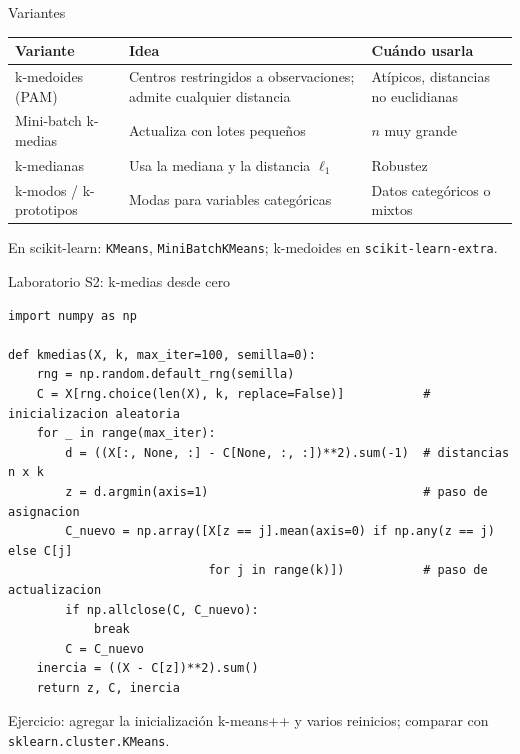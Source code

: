 \documentclass[aspectratio=169,11pt]{beamer}
\begin{document}
\begin{frame}{Variantes}
  \renewcommand{\arraystretch}{1.3}
  \begin{tabular}{@{}>{\raggedright\arraybackslash}p{}>{\raggedright\arraybackslash}p{}>{\raggedright\arraybackslash}p{}@{}}
    \toprule
    \textbf{Variante} & \textbf{Idea} & \textbf{Cuándo usarla}\\
    \midrule
    k-medoides (PAM) & Centros restringidos a observaciones; admite cualquier distancia & Atípicos, distancias no euclidianas \\
    Mini-batch k-medias & Actualiza con lotes pequeños & $n$ muy grande \\
    k-medianas & Usa la mediana y la distancia $\ell_1$ & Robustez \\
    k-modos / k-prototipos & Modas para variables categóricas & Datos categóricos o mixtos \\
    \bottomrule
  \end{tabular}
  \vspace{6pt}
  {\small En scikit-learn: \texttt{KMeans}, \texttt{MiniBatchKMeans}; k-medoides en \texttt{scikit-learn-extra}.}
\end{frame}

\begin{frame}[fragile]{Laboratorio S2: k-medias desde cero}
\begin{lstlisting}
import numpy as np

def kmedias(X, k, max_iter=100, semilla=0):
    rng = np.random.default_rng(semilla)
    C = X[rng.choice(len(X), k, replace=False)]           # inicializacion aleatoria
    for _ in range(max_iter):
        d = ((X[:, None, :] - C[None, :, :])**2).sum(-1)  # distancias n x k
        z = d.argmin(axis=1)                              # paso de asignacion
        C_nuevo = np.array([X[z == j].mean(axis=0) if np.any(z == j) else C[j]
                            for j in range(k)])           # paso de actualizacion
        if np.allclose(C, C_nuevo):
            break
        C = C_nuevo
    inercia = ((X - C[z])**2).sum()
    return z, C, inercia
\end{lstlisting}
  {\small Ejercicio: agregar la inicialización k-means++ y varios reinicios; comparar con \texttt{sklearn.cluster.KMeans}.}
\end{frame}
\end{document}
